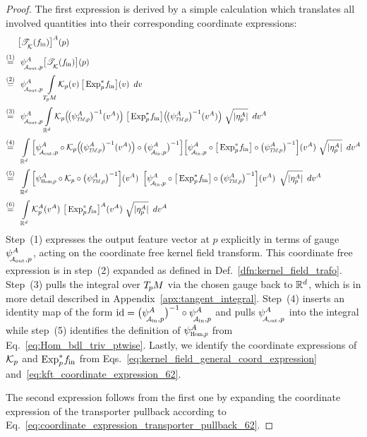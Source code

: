 \begin{proof}
    The first expression is derived by a simple calculation which translates all involved quantities into their corresponding coordinate expressions:
    \begin{align}
        & \ 
            \big[ \TK(\fin) \big]^A (p) \notag \\[.5ex]
        \overset{(1)}{=} & \ \ 
            \psiAoutp^A \big[ \TK(\fin) \big] (p) \notag \\[.5ex]
        \overset{(2)}{=} & \ \ 
            \psiAoutp^A
            \int\limits_{\TpM}\mkern-4mu
            \Kp(v) \,
            \big[\Expspfin\big] (v)
            \,\ dv
        \notag \\[.5ex]
        \overset{(3)}{=} & \ \ 
            \psiAoutp^A
            \int\limits_{\R^d}
            \Kp \pig(\! \big(\psiTMp^A\big)^{-1}(v^A) \pig) \;
            \big[\Expspfin\big] \pig(\!\big( \psiTMp^A \big)^{-1} (v^A) \pig)
            \ \sqrt{|\eta_p^A|}\,\ dv^A
        \notag \\[.5ex]
        \overset{(4)}{=} & \ \ 
            \int\limits_{\R^d}
            \Big[ \psiAoutp^A \circ
            \Kp \pig(\! \big(\psiTMp^A\big)^{-1}(v^A) \pig) \circ
            \big( \psiAinp^A \big)^{-1} \Big]
            \Big[ \psiAinp^A \circ
            \big[\Expspfin\big] \circ \big( \psiTMp^A \big)^{-1} \Big] (v^A)
            \ \sqrt{|\eta_p^A|}\,\ dv^A
        \notag \\[.5ex]
        \overset{(5)}{=} & \ \ 
            \int\limits_{\R^d}
            \Big[ \psiHomp^A \circ \Kp \circ \big(\psiTMp^A\big)^{-1} \Big] (v^A) \,\ 
            \Big[ \psiAinp^A \circ \big[\Expspfin\big] \circ \big( \psiTMp^A \big)^{-1} \Big] (v^A)
            \,\ \sqrt{|\eta_p^A|}\,\ dv^A
        \notag \\[.5ex]
        \overset{(6)}{=} & \ \ 
            \int\limits_{\R^d}
            \Kp^A (v^A) \ 
            \big[\Expspfin\big]^A (v^A)
            \ \sqrt{|\eta_p^A|}\,\ dv^A
    \end{align}
    Step~(1) expresses the output feature vector at $p$ explicitly in terms of gauge $\psiAoutp^A$, acting on the coordinate free kernel field transform.
    This coordinate free expression is in step~(2) expanded as defined in Def.~\ref{dfn:kernel_field_trafo}.
    Step~(3) pulls the integral over $T_{\mkern-1.5mu p}\mkern-.5muM$ via the chosen gauge back to $\mathbb{R}^d$, which is in more detail described in Appendix~\ref{apx:tangent_integral}.
    Step~(4) inserts an identity map of the form $\id = \big(\psiAinp^A \big)^{-1} \circ \psiAinp^A$ and pulls $\psiAoutp^A$ into the integral
    while step~(5) identifies the definition of $\psiHomp^A$ from Eq.~\eqref{eq:Hom_bdl_triv_ptwise}.
    Lastly, we identify the coordinate expressions of $\mathcal{K}_p$ and $\operatorname{Exp}^*_p\mkern-2mu f_\textup{\;\!\!in}$ from Eqs.~\eqref{eq:kernel_field_general_coord_expression} and~\eqref{eq:kft_coordinate_expression_62}.

    The second expression follows from the first one by expanding the coordinate expression of the transporter pullback according to Eq.~\eqref{eq:coordinate_expression_transporter_pullback_62}.
\end{proof}
